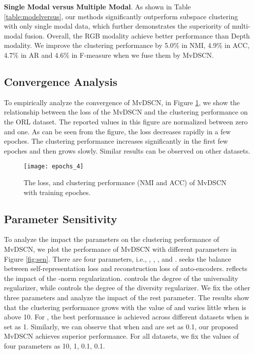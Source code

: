 \documentclass[journal]{IEEEtran}
\begin{document}
\textbf{Single Modal versus Multiple Modal}.
As shown in Table \ref{table:modelversus}, our methods significantly outperform subspace clustering with only single modal data, which further demonstrates the superiority of multi-modal fusion.
Overall, the RGB modality achieve better performance than Depth modality.
We improve the clustering performance by 5.0\% in NMI, 4.9\% in ACC, 4.7\% in AR and 4.6\% in F-measure when we fuse them by MvDSCN.

\subsection{Convergence Analysis}
To empirically analyze the convergence of MvDSCN, in Figure \ref{fig:converage}, we show the relationship between the loss of the MvDSCN and the clustering performance on the ORL dataset.
The reported values in this figure are normalized between zero and one.
As can be seen from the figure, the loss decreases rapidly in a few epoches.
The clustering performance increases significantly in the first few epoches and then grows slowly.
Similar results can be observed on other datasets.
\begin{figure}[!htbp]
	\centering
	\texttt{[image: epochs\_4]}
	\caption{The loss, and clustering performance (NMI and ACC) of MvDSCN with training epoches.}
	\label{fig:converage}
\end{figure}

\subsection{Parameter Sensitivity}
To analyze the impact the parameters on the clustering performance of MvDSCN, we plot the performance of MvDSCN with different parameters in Figure \ref{fig:sen}.
There are four parameters, i.e., , , , and .
 seeks the balance between self-representation loss and reconstruction loss of auto-encoders.
 reflects the impact of the -norm regularization.
 controls the degree of the universality regularizer, while  controls the degree of the diversity regularizer.
We fix the other three parameters and analyze the impact of the rest parameter.
The results show that the clustering performance grows with the value of  and varies little when  is above 10.
For , the best performance is achieved across different datasets when  is set as 1.
Similarly, we can observe that when  and  are set as 0.1, our proposed MvDSCN achieves superior performance.
For all datasets, we fix the values of four parameters as 10, 1, 0.1, 0.1.
\end{document}
